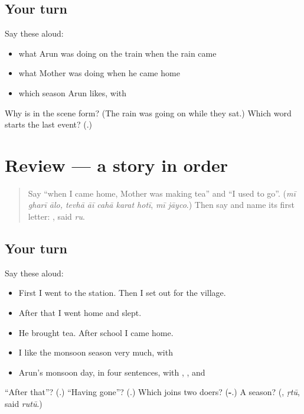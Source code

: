 \subsection*{Your turn}
Say these aloud:

\begin{itemize}
\raggedright
  \item what Arun was doing on the train when the rain came
  \item what Mother was doing when he came home
  \item which season Arun likes, with \textbf{}
\end{itemize}

\begin{tcolorbox}[breakable,colback=teal!4,colframe=teal!35!black,title={Before you move on}]
Why is \textbf{ } in the scene form? (The rain was going on while they sat.) Which word starts the last event? (\textbf{}.)
\end{tcolorbox}
\section[(review)]{Review — a story in order}

\label{lesson:MR-R279-a-story-in-order}



\begin{quote}
Say \textquotedblleft{}when I came home, Mother was making tea\textquotedblright{} and \textquotedblleft{}I used to go\textquotedblright{}. (\emph{mī gharī ālo, tevhā āī cahā karat hotī}, \emph{mī jāyco}.) Then say \textbf{} and name its first letter: \textbf{}, said \emph{ru}.
\end{quote}

\subsection*{Your turn}
Say these aloud:

\begin{itemize}
\raggedright
  \item First I went to the station. Then I set out for the village.
  \item After that I went home and slept.
  \item He brought tea. After school I came home.
  \item I like the monsoon season very much, with \textbf{}
  \item Arun's monsoon day, in four sentences, with \textbf{}, \textbf{}, \textbf{} and \textbf{}
\end{itemize}

\begin{tcolorbox}[breakable,colback=teal!4,colframe=teal!35!black,title={Before you move on}]
\textquotedblleft{}After that\textquotedblright{}? (\textbf{}.) \textquotedblleft{}Having gone\textquotedblright{}? (\textbf{}.) Which joins two doers? (\textbf{-}.) A season? (\textbf{}, \emph{ṛtū}, said \emph{rutū}.)
\end{tcolorbox}

